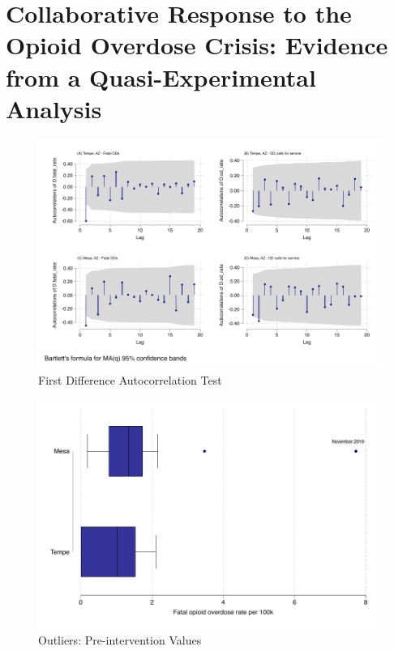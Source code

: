 \chapter{Collaborative Response to the Opioid Overdose Crisis: Evidence from a Quasi-Experimental Analysis}

\begin{figure}
    \centering
    \caption{\centering First Difference Autocorrelation Test}
    \includegraphics{figures/ac-lags-combined.pdf}
\end{figure}

\newpage

\begin{figure}
    \centering
    \caption{\centering Outliers: Pre-intervention Values}
    \includegraphics{figures/outlier.pdf}
\end{figure}

\newpage 





